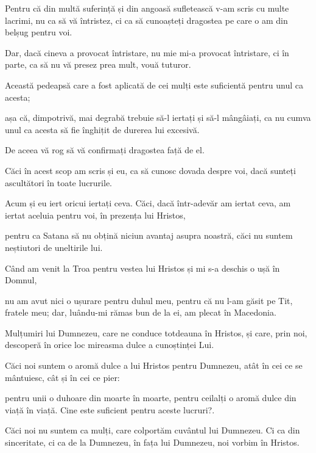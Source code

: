 {Pentru că din multă suferință și din angoasă sufletească v-am scris cu multe lacrimi, nu ca să vă întristez, ci ca să cunoașteți dragostea pe care o am din belșug pentru voi.


\par }{\PP {}Dar, dacă cineva a provocat întristare, nu mie mi-a provocat întristare, ci în parte, ca să nu vă presez prea mult, vouă tuturor.

Această pedeapsă care a fost aplicată de cei mulți este suficientă pentru unul ca acesta;

așa că, dimpotrivă, mai degrabă trebuie să-l iertați și să-l mângâiați, ca nu cumva unul ca acesta să fie înghițit de durerea lui excesivă.

De aceea vă rog să vă confirmați dragostea față de el.

Căci în acest scop am scris și eu, ca să cunosc dovada despre voi, dacă sunteți ascultători în toate lucrurile.

Acum și eu iert oricui iertați ceva. Căci, dacă într-adevăr am iertat ceva, am iertat aceluia pentru voi, în prezența lui Hristos,

pentru ca Satana să nu obțină niciun avantaj asupra noastră, căci nu suntem neștiutori de uneltirile lui.


\par }{\PP {}Când am venit la Troa pentru vestea lui Hristos și mi s-a deschis o ușă în Domnul,

nu am avut nici o ușurare pentru duhul meu, pentru că nu l-am găsit pe Tit, fratele meu; dar, luându-mi rămas bun de la ei, am plecat în Macedonia.


\par }{\PP {}Mulțumiri lui Dumnezeu, care ne conduce totdeauna în Hristos, și care, prin noi, descoperă în orice loc mireasma dulce a cunoștinței Lui.

Căci noi suntem o aromă dulce a lui Hristos pentru Dumnezeu, atât în cei ce se mântuiesc, cât și în cei ce pier:

pentru unii o duhoare din moarte în moarte, pentru ceilalți o aromă dulce din viață în viață. Cine este suficient pentru aceste lucruri?.

Căci noi nu suntem ca mulți, care colportăm cuvântul lui Dumnezeu. Ci ca din sinceritate, ci ca de la Dumnezeu, în fața lui Dumnezeu, noi vorbim în Hristos.



\par }
